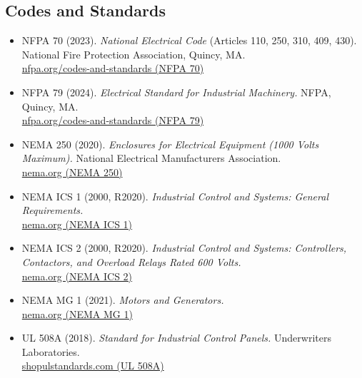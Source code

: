 \documentclass[hidelinks,12pt]{article}
\begin{document}
\subsection*{Codes and Standards}
\begin{itemize}\setlength{\itemsep}{2pt}
    \item NFPA 70 (2023). \emph{National Electrical Code} (Articles 110, 250, 310, 409, 430). National Fire Protection Association, Quincy, MA. \\
      \href{https://www.nfpa.org/codes-and-standards/all-codes-and-standards/list-of-codes-and-standards/detail?code=70}{nfpa.org/codes-and-standards (NFPA 70)}
    \item NFPA 79 (2024). \emph{Electrical Standard for Industrial Machinery.} NFPA, Quincy, MA. \\
      \href{https://www.nfpa.org/codes-and-standards/all-codes-and-standards/list-of-codes-and-standards/detail?code=79}{nfpa.org/codes-and-standards (NFPA 79)}
    \item NEMA 250 (2020). \emph{Enclosures for Electrical Equipment (1000 Volts Maximum).} National Electrical Manufacturers Association. \\
      \href{https://www.nema.org/standards/view/Enclosures-for-Electrical-Equipment-1000-Volts-Maximum}{nema.org (NEMA 250)}
    \item NEMA ICS 1 (2000, R2020). \emph{Industrial Control and Systems: General Requirements.} \\
      \href{https://www.nema.org/standards/view/Industrial-Control-and-Systems-General-Requirements}{nema.org (NEMA ICS 1)}
    \item NEMA ICS 2 (2000, R2020). \emph{Industrial Control and Systems: Controllers, Contactors, and Overload Relays Rated 600 Volts.} \\
      \href{https://www.nema.org/standards/view/Industrial-Control-and-Systems-Controllers-Contactors-and-Overload-Relays-Rated-Not-More-Than-2000-Volts-AC-or-750-Volts-DC}{nema.org (NEMA ICS 2)}
    \item NEMA MG 1 (2021). \emph{Motors and Generators.} \\
      \href{https://www.nema.org/standards/view/Motors-and-Generators}{nema.org (NEMA MG 1)}
    \item UL 508A (2018). \emph{Standard for Industrial Control Panels.} Underwriters Laboratories. \\
      \href{https://www.shopulstandards.com/ProductDetail.aspx?productId=UL508A}{shopulstandards.com (UL 508A)}

\end{itemize}
\end{document}
